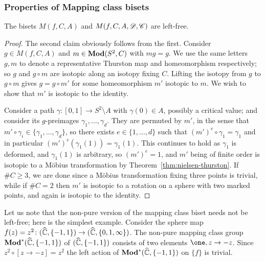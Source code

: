 \documentclass{amsart}
\begin{document}
\subsubsection{Properties of Mapping class bisets}
\begin{prop}\label{prop:MCBfree}
  The bisets $M(f,C,A)$ and $M(f,C,A,{\mathscr D},{\mathscr C})$ are left-free.
\end{prop}
\begin{proof}
  The second claim obviously follows from the first.  Consider
  $g\in M(f,C,A)$ and $m\in\mathbf{\relax Mod}(S^2,C)$ with $mg=g$. We use the
  same letters $g,m$ to denote a representative Thurston map and
  homeomorphism respectively; so $g$ and $g\circ m$ are isotopic along
  an isotopy fixing $C$. Lifting the isotopy from $g$ to $g\circ m$
  gives $g=g\circ m'$ for some homeomorphism $m'$ isotopic to $m$. We
  wish to show that $m'$ is isotopic to the identity.

  Consider a path $\gamma\colon[0,1]\to S^2\setminus A$ with
  $\gamma(0)\in A$, possibly a critical value; and consider its
  $g$-preimages $\gamma_1,\dots,\gamma_d$. They are permuted by $m'$,
  in the sense that $m'\circ\gamma_i\in\{\gamma_1,\dots,\gamma_d\}$,
  so there exists $e\in\{1,\dots,d\}$ such that
  $(m')^e\circ\gamma_1=\gamma_1$ and in particular
  $(m')^e(\gamma_1(1))=\gamma_1(1)$. This continues to hold as
  $\gamma_1$ is deformed, and $\gamma_1(1)$ is arbitrary, so
  $(m')^e=1$, and $m'$ being of finite order is isotopic to a M\"obius
  transformation by Theorem~\ref{thm:nielsen-thurston}. If $\#C\ge3$,
  we are done since a M\"obius transformation fixing three points is
  trivial, while if $\#C=2$ then $m'$ is isotopic to a rotation on a
  sphere with two marked points, and again is isotopic to the
  identity.
\end{proof}

\begin{exple}
  Let us note that the non-pure version of the mapping class biset
  needs not be left-free; here is the simplest example. Consider the
  sphere map $f(z)=z^2\colon
  ({\widehat{{\mathbb C}}},\{-1,1\})\to({\widehat{{\mathbb C}}},\{0,1,\infty\})$. The non-pure mapping class
  group $\mathbf{\relax Mod}^*({\widehat{{\mathbb C}}},\{-1,1\})$ of $({\widehat{{\mathbb C}}},\{-1,1\})$ consists of two
  elements $\one, z\to -z$. Since $z^2 \circ [ z\to -z]=z^2$ the left
  action of $\mathbf{\relax Mod}^*({\widehat{{\mathbb C}}},\{-1,1\})$ on $\{f\}$ is trivial.
\end{exple}
\end{document}
